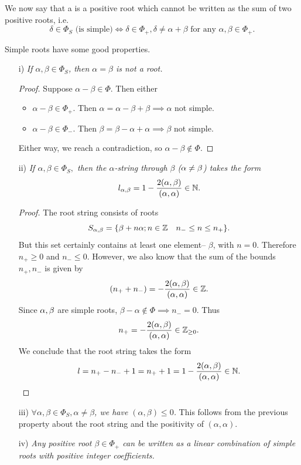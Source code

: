 \begin{defn}
We now say that a  is a positive root which cannot be written as the sum of two positive roots, i.e.
$$\delta \in \Phi_S \text{ (is simple)} \iff \delta \in \Phi_+, \delta \neq \alpha+\beta \text{ for any } \alpha,\beta \in \Phi_+.$$
\end{defn}
Simple roots have some good properties.
\begin{enumerate}
    \item[i)] \textit{If $\alpha,\beta\in \Phi_S$, then $\alpha=\beta$ is not a root.} 
    \begin{proof}
    Suppose $\alpha-\beta\in \Phi$. Then either
    \begin{itemize}
        \item $\alpha-\beta \in \Phi_+$. Then $\alpha=\alpha-\beta+\beta \implies \alpha$ not simple.
        \item $\alpha-\beta \in\Phi_-$. Then $\beta=\beta-\alpha+\alpha \implies \beta$ not simple.
    \end{itemize}
    Either way, we reach a contradiction, so $\alpha-\beta\notin \Phi.$
    \end{proof}
    \item[ii)] \textit{If $\alpha,\beta \in \Phi_S,$ then the $\alpha$-string through $\beta$ ($\alpha\neq \beta$) takes the form}
    $$l_{\alpha,\beta}=1-\frac{2(\alpha,\beta)}{(\alpha,\alpha)}\in \mathbb{N}.$$
    \begin{proof} The root string consists of roots
    $$S_{\alpha,\beta}=\{\beta+n\alpha;n\in \mathbb{Z}\quad n_- \leq n \leq n_+\}.$$
    But this set certainly contains at least one element-- $\beta$, with $n=0$. Therefore $n_+\geq 0$ and $n_-\leq 0$. However, we also know that the sum of the bounds $n_+,n_-$ is given by 
    $$(n_++n_-)=-\frac{2(\alpha,\beta)}{(\alpha,\alpha)}\in \mathbb{Z}.$$
    Since $\alpha,\beta$ are simple roots, $\beta-\alpha \notin \Phi \implies n_- =0$. Thus
    $$n_+ = -\frac{2(\alpha,\beta)}{(\alpha,\alpha)}\in \mathbb{Z}_{\geq 0}.$$
    We conclude that the root string takes the form
    $$l=n_+ - n_- + 1 = n_+ +1 = 1-\frac{2(\alpha,\beta)}{(\alpha,\alpha)} \in \mathbb{N}.$$
    \end{proof}
    \item[iii)] \textit{$\forall \alpha,\beta \in \Phi_S, \alpha \neq \beta$, we have $(\alpha,\beta)\leq 0$.} This follows from the previous property about the root string and the positivity of $(\alpha,\alpha)$.
    \item[iv)] \textit{Any positive root $\beta\in \Phi_+$ can be written as a linear combination of simple roots with positive integer coefficients.}

\end{enumerate}
